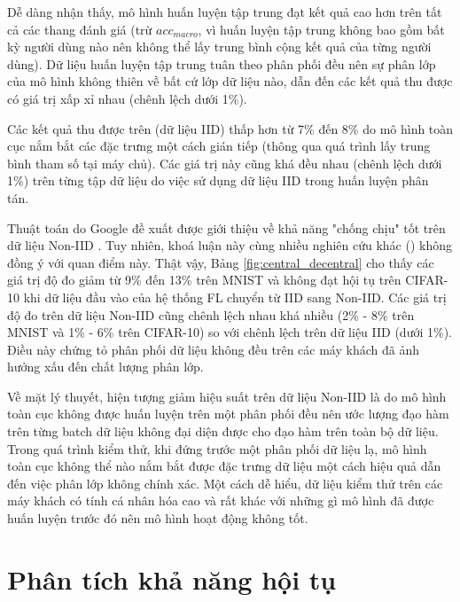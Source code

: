 Dễ dàng nhận thấy, mô hình huấn luyện tập trung đạt kết quả cao hơn trên tất cả các thang đánh giá (trừ $acc_{macro}$, vì huấn luyện tập trung không bao gồm bất kỳ người dùng nào nên không thể lấy trung bình cộng kết quả của từng người dùng). Dữ liệu huấn luyện tập trung tuân theo phân phối đều nên sự phân lớp của mô hình không thiên về bất cứ lớp dữ liệu nào, dẫn đến các kết quả thu được có giá trị xấp xỉ nhau (chênh lệch dưới 1\%).

Các kết quả thu được trên  (dữ liệu IID) thấp hơn từ 7\% đến 8\% do mô hình toàn cục nắm bắt các đặc trưng một cách gián tiếp (thông qua quá trình lấy trung bình tham số tại máy chủ). Các giá trị này cũng khá đều nhau (chênh lệch dưới 1\%) trên từng tập dữ liệu do việc sử dụng dữ liệu IID trong huấn luyện phân tán.

Thuật toán  do Google đề xuất được giới thiệu về khả năng "chống chịu" tốt trên dữ liệu Non-IID \cite{mcmahan2017communication}. Tuy nhiên, khoá luận này cùng nhiều nghiên cứu khác (\parencite{chen2018federated, wang2019federated, zhao2018federated, zhu2021federated}) không đồng ý với quan điểm này. Thật vậy, Bảng \ref{fig:central_decentral} cho thấy các giá trị độ đo giảm từ 9\% đến 13\% trên MNIST và không đạt hội tụ trên CIFAR-10 khi dữ liệu đầu vào của hệ thống FL chuyển từ IID sang Non-IID. Các giá trị độ đo trên dữ liệu Non-IID cũng chênh lệch nhau khá nhiều (2\% - 8\% trên MNIST và 1\% - 6\% trên CIFAR-10) so với chênh lệch trên dữ liệu IID (dưới 1\%). Điều này chứng tỏ phân phối dữ liệu không đều trên các máy khách đã ảnh hưởng xấu đến chất lượng phân lớp.

Về mặt lý thuyết, hiện tượng giảm hiệu suất trên dữ liệu Non-IID là do mô hình toàn cục không được huấn luyện trên một phân phối đều nên ước lượng đạo hàm trên từng batch dữ liệu không đại diện được cho đạo hàm trên toàn bộ dữ liệu. Trong quá trình kiểm thử, khi đứng trước một phân phối dữ liệu lạ, mô hình toàn cục không thể nào nắm bắt được đặc trưng dữ liệu một cách hiệu quả dẫn đến việc phân lớp không chính xác. Một cách dễ hiểu, dữ liệu kiểm thử trên các máy khách có tính cá nhân hóa cao và rất khác với những gì mô hình đã được huấn luyện trước đó nên mô hình hoạt động không tốt.

\section{Phân tích khả năng hội tụ}



